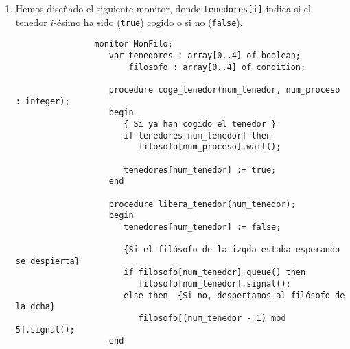 \begin{ejercicio}
    \begin{enumerate}
        \item Hemos diseñado el siguiente monitor, donde \verb|tenedores[i]| indica si el tenedor $i$-ésimo ha sido (\verb|true|) cogido o si no (\verb|false|).
            \begin{verbatim}
                monitor MonFilo;
                   var tenedores : array[0..4] of boolean;
                       filosofo : array[0..4] of condition;

                   procedure coge_tenedor(num_tenedor, num_proceso : integer);
                   begin
                      { Si ya han cogido el tenedor }
                      if tenedores[num_tenedor] then
                         filosofo[num_proceso].wait();

                      tenedores[num_tenedor] := true;
                   end

                   procedure libera_tenedor(num_tenedor);
                   begin
                      tenedores[num_tenedor] := false;

                      {Si el filósofo de la izqda estaba esperando se despierta}
                      if filosofo[num_tenedor].queue() then
                         filosofo[num_tenedor].signal();
                      else then  {Si no, despertamos al filósofo de la dcha}
                         filosofo[(num_tenedor - 1) mod 5].signal();
                   end


\end{verbatim}
\end{enumerate}
\end{ejercicio}
